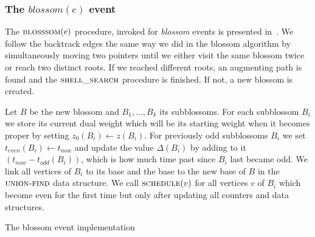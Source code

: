 \subsubsection*{The $blossom(e)$ event}
The $\textsc{blosssom}(e)$ procedure, invoked for \emph{blossom} events is presented in~. We follow the backtrack edges the same way we did in the blossom algorithm by simultaneously moving two pointers until we either visit the same blossom twice or reach two distinct roots. If we reached different roots, an augmenting path is found and the $\textsc{shell\_search}$ procedure is finished. If not, a new blossom is created. 

Let $B$ be the new blossom and $B_1, \dots, B_k$ its subblossoms. For each subblossom $B_i$ we store its current dual weight which will be its starting weight when it becomes proper by setting $z_0(B_i) \gets z(B_i)$. For previously odd subblossoms $B_i$ we set $t_{even}(B_i) \gets t_{now}$ and update the value $\Delta(B_i)$ by adding to it $(t_{now} - t_{odd}(B_i))$, which is how much time past since $B_i$ last became odd. We link all vertices of $B_i$ to its base and the base to the new base of $B$ in the $\textsc{union-find}$ data structure. We call $\textsc{schedule}(v)$ for all vertices $v$ of $B_i$ which become even for the first time but only after updating all counters and data structures.

\begin{algorithm}
\caption{The blossom event implementation}\label{alg:blossom}
\begin{algorithmic}[1]
    \EndIf
            \EndFor
        \EndIf
    \EndFor
    \EndFor
\EndProcedure
\end{algorithmic}
\end{algorithm}

